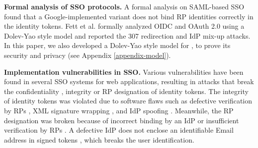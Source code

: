 \noindent\textbf{Formal analysis of SSO protocols.}
A formal analysis on SAML-based SSO \cite{ArmandoCCCT08} found that a Google-implemented variant does not bind RP identities correctly in the identity tokens.
Fett et al. \cite{FettKS16, FettKS17} formally analyzed OIDC and OAuth 2.0 using a Dolev-Yao style model \cite{FettKS14} and reported the 307 redirection and IdP mix-up attacks.
In this paper, we also developed a Dolev-Yao style model for \usso, to prove its security and privacy (see Appendix \ref{appendix-model}).



\noindent\textbf{Implementation vulnerabilities in SSO.}
Various vulnerabilities have been found in several SSO systems for web applications, resulting in attacks %
that break the confidentiality \cite{WangCW12,ccsSunB12, ArmandoCCCPS13, DiscoveringJCS,dimvaLiM16}, integrity \cite{WangCW12, SomorovskyMSKJ12, WangZLG16, MainkaMS16, MainkaMSW17,dimvaLiM16} or RP designation \cite{WangZLG16, MainkaMS16, MainkaMSW17, YangLCZ18,dimvaLiM16} of identity tokens.
The integrity of identity tokens was violated %
due to software flaws such as defective verification by RPs \cite{WangCW12,WangZLG16,MainkaMSW17}, XML signature wrapping \cite{SomorovskyMSKJ12}, and IdP spoofing \cite{MainkaMS16,MainkaMSW17}.
Meanwhile, the RP designation was broken because of incorrect binding by an IdP \cite{YangLCZ18, WangZLG16} or insufficient verification by RPs \cite{MainkaMS16, MainkaMSW17, YangLCZ18}.
A defective IdP does not enclose an identifiable Email address in signed tokens \cite{WangCW12},
 which breaks the user identification.




